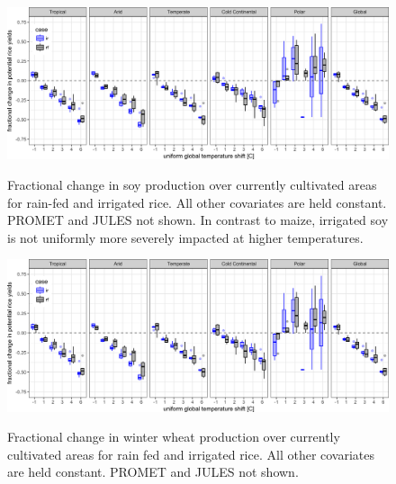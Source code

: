\documentclass[10pt]{article}
\begin{document}
{\begin{figure}[h!]
\includegraphics[width=\textwidth]{s_rice_sim_CG_area_weight.png}\\
\caption{Fractional change in soy production over currently cultivated areas for rain-fed and irrigated rice. All other covariates are held constant. PROMET and JULES not shown. In contrast to maize, irrigated soy is not uniformly more severely impacted at higher temperatures.}
\label{fig:soy_currentcult}
\end{figure}

\begin{figure}[h!]
\includegraphics[width=\textwidth]{s_rice_sim_CG_area_weight.png}\\
\caption{Fractional change in winter wheat production over currently cultivated areas for rain fed and irrigated rice. All other covariates are held constant. PROMET and JULES not shown.}
\label{fig:winter_wheat_currentcult}
\end{figure}

}
\end{document}

